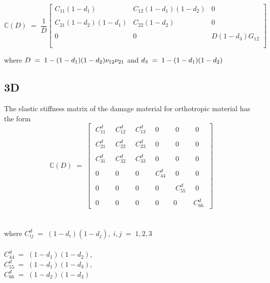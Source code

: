\documentclass[12pt,twoside]{report}
\begin{document}
\begin{equation*}
\mathbb{C}(D) \; = \; \frac{1}{D}
 \begin{bmatrix}
  C_{11}(1 - d_{1}) & C_{12}(1 - d_{1})(1 - d_{2})  & 0 \\
  \\
  C_{21}(1 - d_{2})(1 - d_{1}) & C_{22}(1 - d_{2}) & 0 \\
 \\  
  0 & 0 &  D(1 - d_{3})G_{12} \\
  \\
 \end{bmatrix}
\end{equation*}

where $\mathlarger{D \; = \; 1 - (1 - d_{1})(1 - d_{2}) \nu_{12}\nu_{21}}$ and $\mathlarger{d_{3} \; = \; 1 - (1 - d_{1})(1 - d_{2}) }$



\subsection{3D}
\indent\indent\indent The elastic stiffness matrix of the damage material for orthotropic material has the form \\


$$
\mathbb{C}(D) \; = \; 
\begin{bmatrix}
\;C_{11}^{d} \; & \; C_{12}^{d}\; & \;C_{13}^{d} \; & \;0 \; & \;0 \; &\; 0 \;\\
  \\
 \; C_{21}^{d}\; & \;C_{22}^{d}\;  &\; C_{23}^{d}\; & \;0\; &\; 0\; & \; 0 \;\\
 \\  
 \; C_{31}^{d}\; & \; C_{32}^{d}\; &\; C_{33}^{d}\;  & \;0 \;& \;0 \;& \;0 \;\\
  \\
 \; 0 \; & \; 0 \; & \; 0 \; & \; C_{44}^{d} \;  & \; 0\; &\; 0\; \\
  \\
  \; 0 \; & \; 0 \; & \; 0\; &\; 0\; &\; C_{55}^{d}\; &\; 0\; \\
  \\
 \; 0\; & \;0 \;& \; 0\; &\; 0 \;& 0 \;& C_{66}^{d}\;
 \end{bmatrix}
$$
\\
\\
where \; $C_{ij}^{d}\; = \; (1 - d_{i})(1 - d_{j}), \; i,j \; = \; 1,2,3 $ \\
\\
 $C_{44}^{d}\; = \; (1 - d_{1})(1 - d_{2}), $ \\
 $C_{55}^{d}\; = \; (1 - d_{1})(1 - d_{3}),  $ \\
 $C_{66}^{d}\; = \; (1 - d_{2})(1 - d_{3}) $ \\
\end{document}
